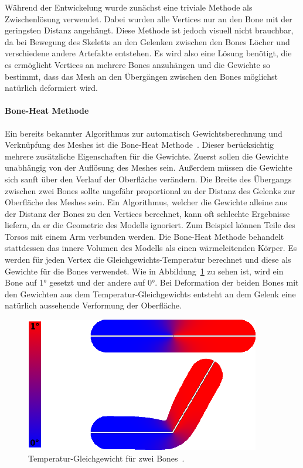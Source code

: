 Während der Entwickelung wurde zunächst eine triviale Methode als Zwischenlösung verwendet. Dabei wurden alle Vertices nur an den Bone mit der geringsten Distanz angehängt. Diese Methode ist jedoch visuell nicht brauchbar, da bei Bewegung des Skeletts an den Gelenken zwischen den Bones Löcher und verschiedene andere Artefakte entstehen. Es wird also eine Lösung benötigt, die es ermöglicht Vertices an mehrere Bones anzuhängen und die Gewichte so bestimmt, dass das Mesh an den Übergängen zwischen den Bones möglichst natürlich deformiert wird.

\paragraph{Bone-Heat Methode}
Ein bereits bekannter Algorithmus zur automatisch Gewichtsberechnung und Verknüpfung des Meshes ist die Bone-Heat Methode~\cite{bone_heat_paper}. Dieser berücksichtig mehrere zusätzliche Eigenschaften für die Gewichte. Zuerst sollen die Gewichte unabhängig von der Auflösung des Meshes sein. Außerdem müssen die Gewichte sich sanft über den Verlauf der Oberfläche verändern. Die Breite des Übergangs zwischen zwei Bones sollte ungefähr proportional zu der Distanz des Gelenks zur Oberfläche des Meshes sein.
Ein Algorithmus, welcher die Gewichte alleine aus der Distanz der Bones zu den Vertices berechnet, kann oft schlechte Ergebnisse liefern, da er die Geometrie des Modells ignoriert. Zum Beispiel können Teile des Torsos mit einem Arm verbunden werden. Die Bone-Heat Methode behandelt stattdessen das innere Volumen des Modells als einen wärmeleitenden Körper. Es werden für jeden Vertex die Gleichgewichts-Temperatur berechnet und diese als Gewichte für die Bones verwendet. Wie in Abbildung~\ref{fig:bone_heat_equilibrium} zu sehen ist, wird ein Bone auf 1° gesetzt und der andere auf 0°. Bei Deformation der beiden Bones mit den Gewichten aus dem Temperatur-Gleichgewichts entsteht an dem Gelenk eine natürlich aussehende Verformung der Oberfläche.

\begin{figure}[h!]
	\centering
	\includegraphics[width=0.7\linewidth]{resources/img/bone_heat_equilibrium.png}
	\caption{Temperatur-Gleichgewicht für zwei Bones~\cite{bone_heat_paper}.}
	\label{fig:bone_heat_equilibrium}
\end{figure}

